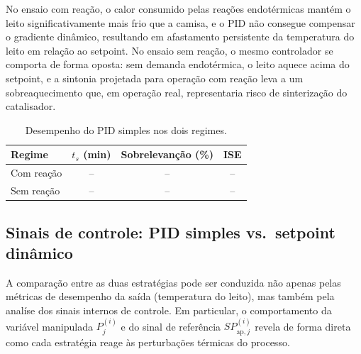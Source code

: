 No ensaio com reação, o calor consumido pelas reações endotérmicas mantém o
leito significativamente mais frio que a camisa, e o PID não consegue compensar
o gradiente dinâmico, resultando em afastamento persistente da temperatura do
leito em relação ao setpoint. No ensaio sem reação, o mesmo controlador
se comporta de forma oposta: sem demanda endotérmica, o leito aquece acima do
setpoint, e a sintonia projetada para operação com reação leva a um
sobreaquecimento que, em operação real, representaria risco de sinterização
do catalisador.

\begin{table}[ht]
\begin{center}
\caption{Desempenho do PID simples nos dois regimes.}
\label{tab:metricas_pid}
\begin{tabular}{lccc}
\hline
Regime & $t_s$ (min) & Sobrelevanção (\%) & ISE \\
\hline
Com reação & -- & -- & -- \\
Sem reação & -- & -- & -- \\
\hline
\end{tabular}
\end{center}
\end{table}


\subsection{Sinais de controle: PID simples vs.\ setpoint dinâmico}
\label{sec:comparacao_sinais}

A comparação entre as duas estratégias pode ser conduzida não apenas pelas
métricas de desempenho da saída (temperatura do leito), mas também pela
analíse dos sinais internos de controle. Em particular, o comportamento da
variável manipulada $P^{(i)}_j$ e do sinal de referência $SP^{(i)}_{\mathrm{ap},j}$
revela de forma direta como cada estratégia reage às perturbações térmicas
do processo.

